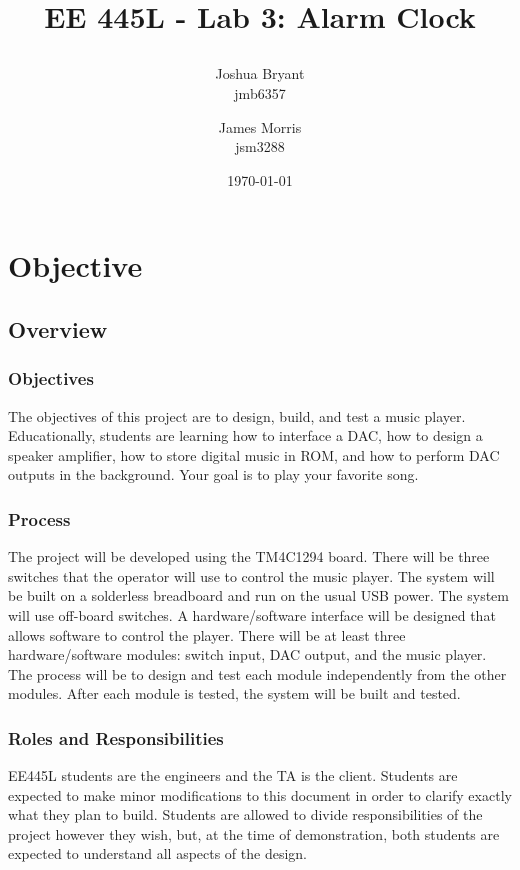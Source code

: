 \documentclass{article}
\title{\begin{LARGE}
	\textbf{EE 445L - Lab 3: Alarm Clock}
\end{LARGE}} %
\author{Joshua Bryant \\ jmb6357 \and James Morris \\ jsm3288} %
\date{\today} %
\begin{document}
\maketitle %


\section{Objective}

	\subsection{Overview}

		\subsubsection{Objectives}
			The objectives of this project are to design, build, and test a music player. Educationally, students are learning how to interface a DAC, how to design a speaker amplifier, how to store digital music in ROM, and how to perform DAC outputs in the background. Your goal is to play your favorite song.
		\subsubsection{Process}
			The project will be developed using the TM4C1294 board. There will be three switches that the operator will use to control the music player. The system will be built on a solderless breadboard and run on the usual USB power. The system will use off-board switches. A hardware/software interface will be designed that allows software to control the player. There will be at least three hardware/software modules: switch input, DAC output, and the music player. The process will be to design and test each module independently from the other modules. After each module is tested, the system will be built and tested.
		\subsubsection{Roles and Responsibilities}
			EE445L students are the engineers and the TA is the client. Students are expected to make minor modifications to this document in order to clarify exactly what they plan to build. Students are allowed to divide responsibilities of the project however they wish, but, at the time of demonstration, both students are expected to understand all aspects of the design.
\end{document}
